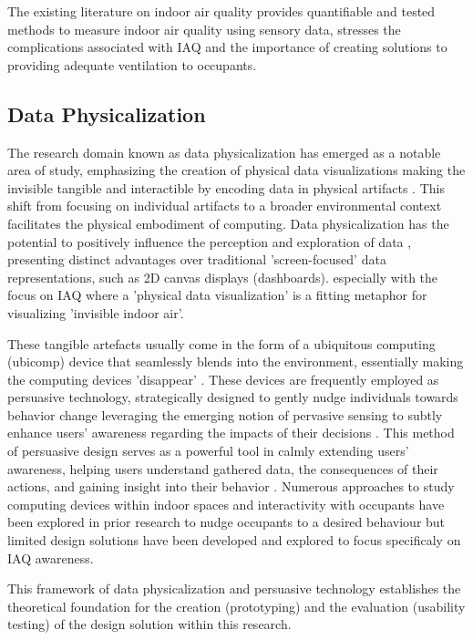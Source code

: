 The existing literature on indoor air quality provides quantifiable and tested methods to measure indoor air quality using sensory data, stresses the complications associated with IAQ and the importance of creating solutions to providing adequate ventilation to occupants. 


\subsection{Data Physicalization}

The research domain known as data physicalization \cite{alexander_data_2019} has emerged as a notable area of study, emphasizing the creation of physical data visualizations making the invisible tangible and interactible by encoding data in physical artifacts \cite{ranasinghe_encoding_2023}. This shift from focusing on individual artifacts to a broader environmental context facilitates the physical embodiment of computing. Data physicalization has the potential to positively influence the perception and exploration of data \cite{jansen_opportunities_2015}, presenting distinct advantages over traditional 'screen-focused' data representations, such as 2D canvas displays (dashboards). \cite{hornecker_design_2023} especially with the focus on IAQ where a 'physical data visualization' is a fitting metaphor for visualizing 'invisible indoor air'.

These tangible artefacts usually come in the form of a ubiquitous computing (ubicomp) \cite{bell_yesterdays_2007} device that seamlessly blends into the environment, essentially making the computing devices 'disappear' \cite{weiser_computer_1999}. These devices are frequently employed as persuasive technology, strategically designed to gently nudge individuals towards behavior change leveraging the emerging notion of pervasive sensing to subtly enhance users' awareness regarding the impacts of their decisions \cite{bader_windowwall_2019, rogers_ambient_2010}. This method of persuasive design serves as a powerful tool in calmly extending users' awareness, helping users understand gathered data, the consequences of their actions, and gaining insight into their behavior \cite{bae_making_2022}. Numerous approaches to study computing devices within indoor spaces and interactivity with occupants have been explored in prior research \cite{sauve_physecology_2022} to nudge occupants to a desired behaviour but limited design solutions have been developed and explored to focus specificaly on IAQ awareness. 



This framework of data physicalization and persuasive technology establishes the theoretical foundation for the creation (prototyping) and the evaluation (usability testing) of the design solution within this research.
